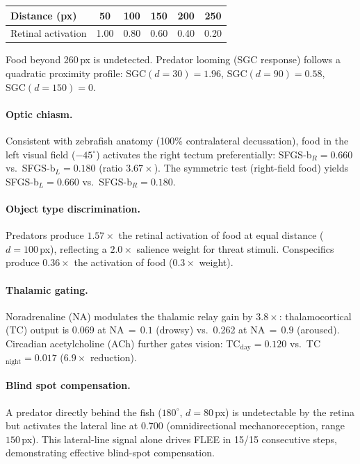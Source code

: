 \documentclass[11pt,a4paper]{article}
\begin{document}
\begin{table}[H]
\centering
\small
\begin{tabular}{lccccc}
\toprule
Distance (px) & 50 & 100 & 150 & 200 & 250 \\
\midrule
Retinal activation & 1.00 & 0.80 & 0.60 & 0.40 & 0.20 \\
\bottomrule
\end{tabular}
\end{table}

\noindent Food beyond 260\,px is undetected.
Predator looming (SGC response) follows a quadratic proximity profile:
$\text{SGC}(d=30) = 1.96$, $\text{SGC}(d=90) = 0.58$, $\text{SGC}(d=150) = 0$.

\paragraph{Optic chiasm.}
Consistent with zebrafish anatomy (100\% contralateral decussation),
food in the left visual field ($-45^\circ$) activates the right tectum
preferentially: SFGS-b$_R = 0.660$ vs.\ SFGS-b$_L = 0.180$ (ratio $3.67\times$).
The symmetric test (right-field food) yields SFGS-b$_L = 0.660$ vs.\ SFGS-b$_R = 0.180$.

\paragraph{Object type discrimination.}
Predators produce $1.57\times$ the retinal activation of food at equal distance
($d=100$\,px), reflecting a $2.0\times$ salience weight for threat stimuli.
Conspecifics produce $0.36\times$ the activation of food ($0.3\times$ weight).

\paragraph{Thalamic gating.}
Noradrenaline (NA) modulates the thalamic relay gain by $3.8\times$:
thalamocortical (TC) output is 0.069 at NA$\,=\,0.1$ (drowsy) vs.\ 0.262
at NA$\,=\,0.9$ (aroused). Circadian acetylcholine (ACh) further gates vision:
TC$_\text{day} = 0.120$ vs.\ TC$_\text{night} = 0.017$ ($6.9\times$ reduction).

\paragraph{Blind spot compensation.}
A predator directly behind the fish ($180^\circ$, $d = 80$\,px) is undetectable
by the retina but activates the lateral line at 0.700
(omnidirectional mechanoreception, range $150$\,px).
This lateral-line signal alone drives FLEE in 15/15 consecutive steps,
demonstrating effective blind-spot compensation.
\end{document}
